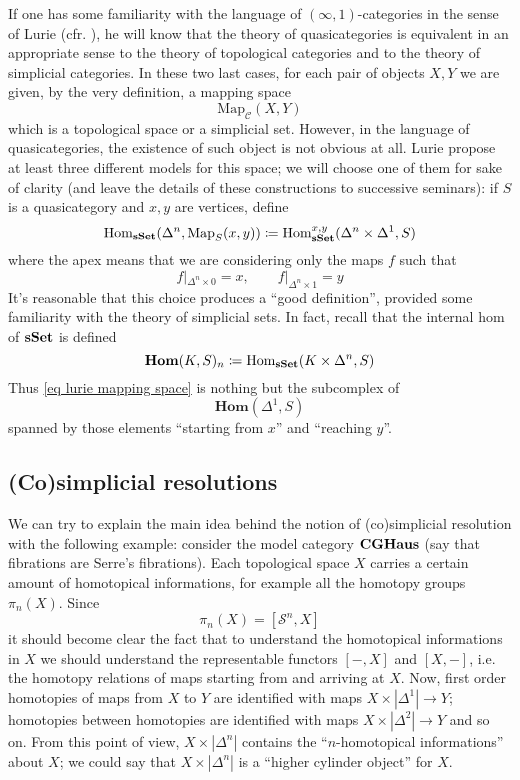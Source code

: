 \begin{refsection}
If one has some familiarity with the language of $(\infty,1)$-categories in the sense of Lurie (cfr. \cite{htt}), he will know that the theory of quasicategories is equivalent in an appropriate sense to the theory of topological categories and to the theory of simplicial categories. In these two last cases, for each pair of objects $X,Y$ we are given, by the very definition, a mapping space
\[
\mathrm{Map}_{\mathcal C}(X,Y)
\]
which is a topological space or a simplicial set. However, in the language of quasicategories, the existence of such object is not obvious at all. Lurie propose at least three different models for this space; we will choose one of them for sake of clarity (and leave the details of these constructions to successive seminars): if $S$ is a quasicategory and $x,y$ are vertices, define
\begin{equation} \label{eq lurie mapping space}
\mathrm{Hom}_{\mathbf{s\,\!\mathbf{Set}}}(\Delta^n, \mathrm{Map}_S(x,y))\coloneqq \mathrm{Hom}_{\mathbf{s\,\!\mathbf{Set}}}^{x,y}(\Delta^n \times \Delta^1, S)
\end{equation}
where the apex means that we are considering only the maps $f$ such that
\[
f |_{\Delta^n \times 0} = x, \qquad f |_{\Delta^n \times 1} = y
\]
It's reasonable that this choice produces a ``good definition'', provided some familiarity with the theory of simplicial sets. In fact, recall that the internal hom of $\mathbf{s\,\!\mathbf{Set}}$ is defined
\[
\mathbf{Hom}(K,S)_n\coloneqq \mathrm{Hom}_{\mathbf{s\,\!\mathbf{Set}}}(K \times \Delta^n, S)
\]
Thus \eqref{eq lurie mapping space} is nothing but the subcomplex of
\[
\mathbf{Hom}(\Delta^1,S)
\]
spanned by those elements ``starting from $x$'' and ``reaching $y$''.

\subsection{(Co)simplicial resolutions} \label{cosimplicial resolutions}

We can try to explain the main idea behind the notion of (co)simplicial resolution with the following example: consider the model category $\mathbf{CGHaus}$ (say that fibrations are Serre's fibrations). Each topological space $X$ carries a certain amount of homotopical informations, for example all the homotopy groups $\pi_n(X)$. Since
\[
\pi_n(X) = [\mathcal S^n, X]
\]
it should become clear the fact that to understand the homotopical informations in $X$ we should understand the representable functors $[-,X]$ and $[X,-]$, i.e. the homotopy relations of maps starting from and arriving at $X$. Now, first order homotopies of maps from $X$ to $Y$ are identified with maps $X \times |\Delta^1| \to Y$; homotopies between homotopies are identified with maps $X \times |\Delta^2| \to Y$ and so on. From this point of view, $X \times |\Delta^n|$ contains the ``$n$-homotopical informations'' about $X$; we could say that $X \times |\Delta^n|$ is a ``higher cylinder object'' for $X$.


\end{refsection}
